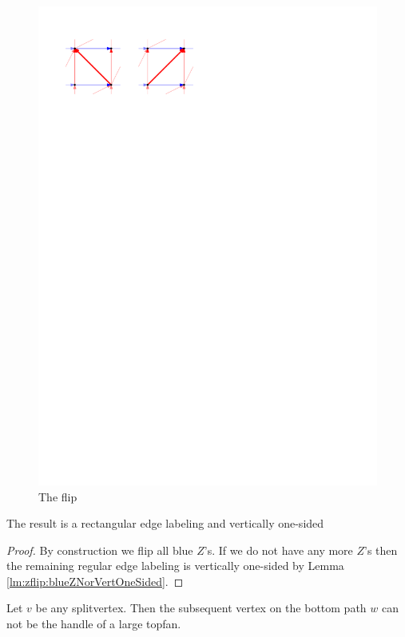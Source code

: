   \begin{figure}[h]
    \centering
    \includegraphics[scale=1]{unifiedAlgo/img/zflip/flip.pdf}
    \caption{The flip}
    \label{fig:zflip:flip}
  \end{figure}

  \begin{lemma}
    \label{lm:sweep:vertOnsided}
    The result is a rectangular edge labeling and vertically one-sided
  \end{lemma}
  \begin{proof}
    By construction we flip all blue $Z$'s. If we do not have any more $Z$'s then the remaining regular edge labeling is vertically one-sided by Lemma \ref{lm:zflip:blueZNorVertOneSided}.
  \end{proof}

  \begin{lemma}
    \label{lm:sweep:NoTwoSplitsAboveEachOtherVertOnesided}
    Let $v$ be any splitvertex. Then the subsequent vertex on the bottom path $w$ can not be the handle of a large topfan.
  \end{lemma}

